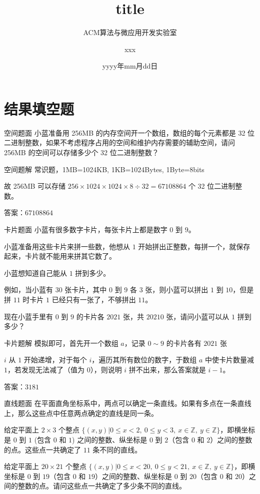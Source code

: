 \documentclass{pptt}
\title{title}
\author{ACM算法与微应用开发实验室 \and xxx}
\date{yyyy年mm月dd日}
\begin{document}
\maketitle

\section{结果填空题}

\begin{frame}{空间}{题面}
    小蓝准备用 256MB 的内存空间开一个数组，数组的每个元素都是 32 位二进制整数，如果不考虑程序占用的空间和维护内存需要的辅助空间，请问 256MB 的空间可以存储多少个 32 位二进制整数？
\end{frame}

\begin{frame}{空间}{题解}
    常识题，1MB=1024KB, 1KB=1024Bytes, 1Byte=8bits

    故 256MB 可以存储 $256 \times 1024 \times 1024 \times 8 \div 32=67108864$ 个 32 位二进制整数。

    答案：$67108864$
\end{frame}

\begin{frame}{卡片}{题面}
    小蓝有很多数字卡片，每张卡片上都是数字 $0$ 到 $9$。

    小蓝准备用这些卡片来拼一些数，他想从 $1$ 开始拼出正整数，每拼一个，就保存起来，卡片就不能用来拼其它数了。

    小蓝想知道自己能从 $1$ 拼到多少。

    例如，当小蓝有 $30$ 张卡片，其中 $0$ 到 $9$ 各 $3$ 张，则小蓝可以拼出 $1$ 到 $10$，但是拼 $11$ 时卡片 $1$ 已经只有一张了，不够拼出 $11$。

    现在小蓝手里有 $0$ 到 $9$ 的卡片各 $2021$ 张，共 $20210$ 张，请问小蓝可以从 $1$ 拼到多少？
\end{frame}

\begin{frame}{卡片}{题解}
    模拟即可，首先开一个数组 $a$，记录 $0 \sim 9$ 的卡片各有 $2021$ 张

    $i$ 从 $1$ 开始递增，对于每个 $i$，遍历其所有数位的数字，于数组 $a$ 中使卡片数量减 $1$，若发现无法减了（值为 $0$），则说明 $i$ 拼不出来，那么答案就是 $i-1$。

    答案：$3181$
\end{frame}

\begin{frame}{直线}{题面}
    在平面直角坐标系中，两点可以确定一条直线。如果有多点在一条直线上，那么这些点中任意两点确定的直线是同一条。

    给定平面上 $2 \times 3$ 个整点 $\{(x,y)|0 \leq x < 2,~0 \leq y < 3,~x \in \mathbb{Z},~y \in \mathbb{Z}\}$，即横坐标是 $0$ 到 $1$ (包含 $0$ 和 $1$) 之间的整数、纵坐标是 $0$ 到 $2$（包含 $0$ 和 $2$）之间的整数的点。这些点一共确定了 $11$ 条不同的直线。

    给定平面上 $20 \times 21$ 个整点 $\{(x,y)|0 \leq x < 20,~0 \leq y < 21,~x \in \mathbb{Z},~y \in \mathbb{Z}\}$，即横坐标是 $0$ 到 $19$（包含 $0$ 和 $19$）之间的整数、纵坐标是 $0$ 到 $20$（包含 $0$ 和 $20$）之间的整数的点。请问这些点一共确定了多少条不同的直线。
\end{frame}
\end{document}
